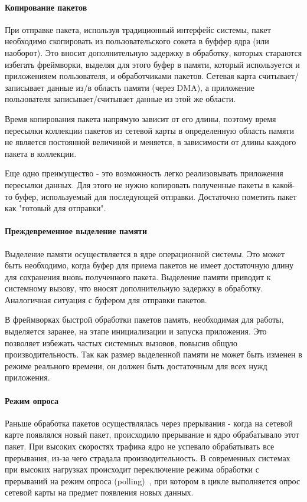 \paragraph{Копирование пакетов}

При отправке пакета, используя традиционный интерфейс системы, пакет необходимо скопировать из пользовательского сокета в буффер ядра (или наоборот). Это вносит дополнительную задержку в обработку, которых стараются избегать фреймворки, выделяя для этого буфер в памяти, который используется и приложенияем пользователя, и обработчиками пакетов. Сетевая карта считывает/записывает данные из/в область памяти (через DMA), а приложение пользователя записывает/считывает данные из этой же области.

Время копирования пакета напрямую зависит от его длины, поэтому время пересылки коллекции пакетов из сетевой карты в определенную область памяти не является постоянной величиной и меняется, в зависимости от длины каждого пакета в коллекции.

Еще одно преимущество - это возможность легко реализовывать приложения пересылки данных. Для этого не нужно копировать полученные пакеты в какой-то буфер, используемый для последующей отправки. Достаточно пометить пакет как "готовый для отправки".

\paragraph{Преждевременное выделение памяти}

Выделение памяти осуществляется в ядре операционной системы. Это может быть необходимо, когда буфер для приема пакетов не имеет достаточную длину для сохранения вновь полученного пакета. Выделение памяти приводит к системному вызову, что вносят дополнительную задержку в обработку. Аналогичная ситуация с буфером для отправки пакетов.

В фреймворках быстрой обработки пакетов память, необходимая для работы, выделяется заранее, на этапе инициализации и запуска приложения. Это позволяет избежать частых системных вызовов, повысив общую производительность. Так как размер выделенной памяти не может быть изменен в режиме реального времени, он должен быть достаточным для всех нужд приложения.

\paragraph{Режим опроса}

Раньше обработка пакетов осуществлялась через прерывания - когда на сетевой карте появлялся новый пакет, происходило прерывание и ядро обрабатывало этот пакет. При высоких скоростях трафика  ядро не успевало обрабатывать все прерывания, из-за чего страдала производительность. В современных системах при высоких нагрузках происходит переключение режима обработки с прерываний на режим опроса (polling)~\cite{modern_os}, при котором в цикле выполняется опрос сетевой карты на предмет появления новых данных.

